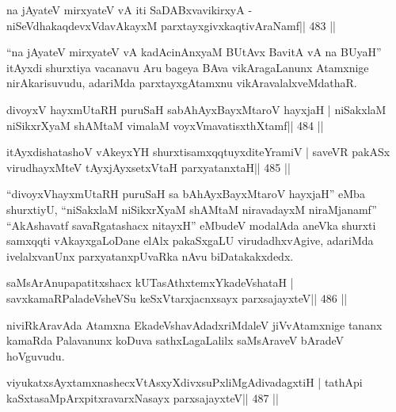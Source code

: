\begin{shl}
na jAyateV mirxyateV vA iti SaDABxvavikirxyA -
niSeVdhakaqdevxVdavAkayxM parxtayxgivxkaqtivAraNamf\hfill || 483 ||
\end{shl}

\begin{artha}
``na jAyateV mirxyateV vA kadAcinAnxyaM BUtAvx BavitA vA na BUyaH'' itAyxdi shurxtiya vacanavu Aru bageya BAva vikAragaLanunx Atamxnige nirAkarisuvudu, adariMda  parxtayxgAtamxnu vikAravalalxveMdathaR.
\end{artha}



\begin{shl}
divoyxV hayxmUtaRH puruSaH sabAhAyxBayxMtaroV hayxjaH |
niSakxlaM niSikxrXyaM shAMtaM vimalaM voyxVmavatisxthXtamf\hfill || 484 ||
\end{shl}

\begin{shl}
itAyxdishatashoV vAkeyxYH shurxtisamxqqtuyxditeYramiV |
saveVR pakASx virudhayxMteV tAyxjAyxsetxV\s taH parxyatanxtaH\hfill || 485 ||
\end{shl}

\begin{artha}
``divoyxVhayxmUtaRH puruSaH sa bAhAyxBayxMtaroV hayxjaH'' eMba shurxtiyU, ``niSakxlaM niSikxrXyaM shAMtaM niravadayxM niraMjanamf'' ``AkAshavatf savaRgatashacx nitayxH'' eMbudeV modalAda aneVka shurxti samxqqti vAkayxgaLoDane elAlx pakaSxgaLU virudadhxvAgive, adariMda ivelalxvanUnx parxyatanxpUvaRka nAvu biDatakakxdedx.
\end{artha}



\begin{shl}
saMsArAnupapatitxshacx kUTasAthxtemxYkadeVshataH |
savxkamaRPaladeVsheVSu keSxVtarxjacnxsayx parxsajayxteV\hfill || 486 ||
\end{shl}

\begin{artha}
niviRkAravAda Atamxna EkadeVshavAdadxriMdaleV jiVvAtamxnige tananx kamaRda Palavanunx koDuva sathxLagaLalilx saMsAraveV bAradeV hoVguvudu.
\end{artha}

\begin{shl}
viyukatxsAyx\s\s tamxnashecxVtAsxyXdivxsuPxliMgAdivadagxtiH |
tathA\s pi kaSxtasaMpArxpitxravarxNasayx parxsajayxteV\hfill || 487 ||
\end{shl}

